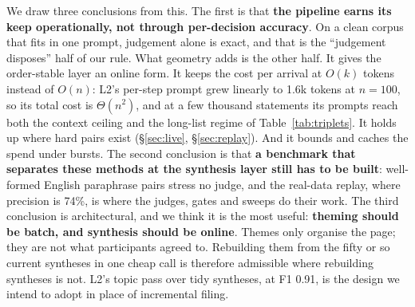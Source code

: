 We draw three conclusions from this. The first is that \textbf{the pipeline earns its keep operationally, not through per-decision accuracy}. On a clean corpus that fits in one prompt, judgement alone is exact, and that is the ``judgement disposes'' half of our rule. What geometry adds is the other half. It gives the order-stable layer an online form. It keeps the cost per arrival at $O(k)$ tokens instead of $O(n)$: L2's per-step prompt grew linearly to 1.6k tokens at $n{=}100$, so its total cost is $\Theta(n^2)$, and at a few thousand statements its prompts reach both the context ceiling and the long-list regime of Table~\ref{tab:triplets}. It holds up where hard pairs exist (\S\ref{sec:live}, \S\ref{sec:replay}). And it bounds and caches the spend under bursts. The second conclusion is that \textbf{a benchmark that separates these methods at the synthesis layer still has to be built}: well-formed English paraphrase pairs stress no judge, and the real-data replay, where precision is 74\%, is where the judges, gates and sweeps do their work. The third conclusion is architectural, and we think it is the most useful: \textbf{theming should be batch, and synthesis should be online}. Themes only organise the page; they are not what participants agreed to. Rebuilding them from the fifty or so current syntheses in one cheap call is therefore admissible where rebuilding syntheses is not. L2's topic pass over tidy syntheses, at F1 0.91, is the design we intend to adopt in place of incremental filing.
